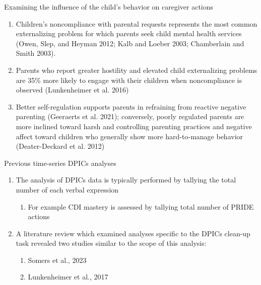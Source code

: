 \documentclass[
  ignorenonframetext,
]{beamer}
\providecommand{\tightlist}{%
  \setlength{\itemsep}{0pt}\setlength{\parskip}{0pt}}
\begin{document}
\begin{frame}{Examining the influence of the child's behavior on
caregiver actions}
\label{examining-the-influence-of-the-childs-behavior-on-caregiver-actions}
\begin{enumerate}
\tightlist
\item
  Children's noncompliance with parental requests represents the most
  common externalizing problem for which parents seek child mental
  health services (Owen, Slep, and Heyman 2012; Kalb and Loeber 2003;
  Chamberlain and Smith 2003).
\item
  Parents who report greater hostility and elevated child externalizing
  problems are 35\% more likely to engage with their children when
  noncompliance is observed (Lunkenheimer et al. 2016)
\item
  Better self-regulation supports parents in refraining from reactive
  negative parenting (Geeraerts et al. 2021); conversely, poorly
  regulated parents are more inclined toward harsh and controlling
  parenting practices and negative affect toward children who generally
  show more hard-to-manage behavior (Deater-Deckard et al. 2012)
\end{enumerate}
\end{frame}

\begin{frame}{Previous time-series DPICs analyses}
\label{previous-time-series-dpics-analyses}
\begin{enumerate}
\tightlist
\item
  The analysis of DPICs data is typically performed by tallying the
  total number of each verbal expression

  \begin{enumerate}
  \tightlist
  \item
    For example CDI mastery is assessed by tallying total number of
    PRIDE actions
  \end{enumerate}
\item
  A literature review which examined analyses specific to the DPICs
  clean-up task revealed two studies similar to the scope of this
  analysis:

  \begin{enumerate}
  \tightlist
  \item
    Somers et al., 2023
  \item
    Lunkenheimer et al., 2017
  \end{enumerate}
\end{enumerate}
\end{frame}
\end{document}
